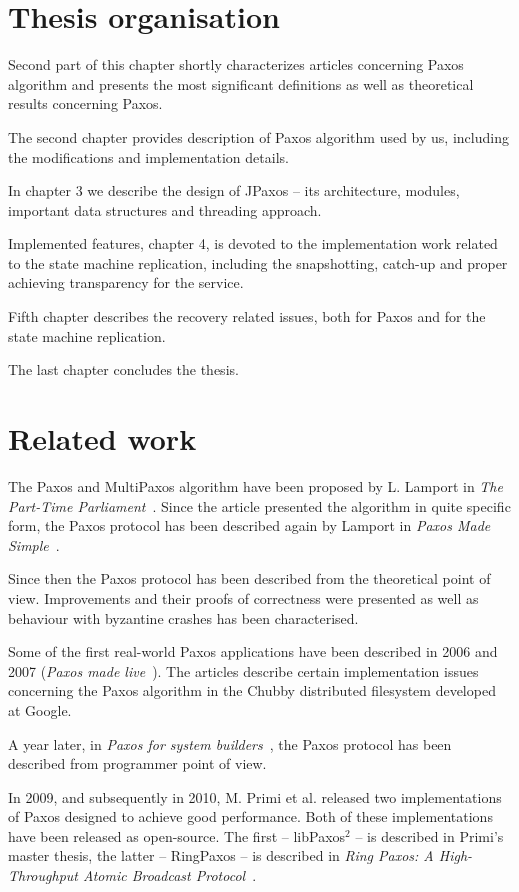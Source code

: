 \section{Thesis organisation}
Second part of this chapter %
shortly characterizes articles concerning Paxos algorithm and presents the most significant definitions as well as theoretical results concerning Paxos.

The second chapter provides description of Paxos algorithm used by us, including the modifications and implementation details.

In chapter 3 we describe the design of JPaxos -- its architecture, modules, important data structures and threading approach.

Implemented features, chapter 4, is devoted to the implementation work related to the state machine replication, including the snapshotting, catch-up and proper achieving transparency for the service.

Fifth chapter describes the recovery related issues, both for Paxos and for the state machine replication.

The last chapter concludes the thesis. %

\section{Related work}



The Paxos and MultiPaxos algorithm have been proposed by L. Lamport in \textit{The Part-Time Parliament}~\cite{Lam98}. Since the article presented the algorithm in quite specific form, the Paxos protocol has been described again by Lamport in \textit{Paxos Made Simple}~\cite{Lam01}.

Since then the Paxos protocol has been described from the theoretical point of view. Improvements and their proofs of correctness were presented as well as behaviour with byzantine crashes has been characterised.

Some of the first real-world Paxos applications have been described in 2006 and 2007 (\textit{Paxos made live}~\cite{CGR07}). The articles describe certain implementation issues concerning the Paxos algorithm in the Chubby distributed filesystem developed at Google.

A year later, in \textit{Paxos for system builders}~\cite{AK08}, the Paxos protocol has been described from programmer point of view.

In 2009, and subsequently in 2010, M. Primi et al. released two implementations of Paxos designed to achieve good performance. Both of these implementations have been released as open-source. The first -- libPaxos$^2$ -- is described in Primi's master thesis, the latter -- RingPaxos -- is described in \textit{Ring Paxos: A High-Throughput Atomic Broadcast Protocol}~\cite{Mar10}.

